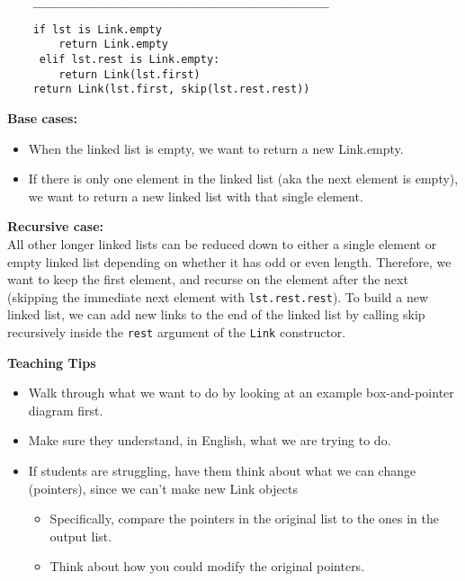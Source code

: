 \begin{parts}
\begin{blocksection}
\begin{lstlisting}
    ______________________________________________
\end{lstlisting}
\begin{solution}[0in]
\begin{lstlisting}
    if lst is Link.empty
    	return Link.empty
     elif lst.rest is Link.empty:
        return Link(lst.first)
    return Link(lst.first, skip(lst.rest.rest))
\end{lstlisting}
\textbf{Base cases:}
\begin{itemize}
\item When the linked list is empty, we want to return a new Link.empty.
\item If there is only one element in the linked list (aka the next element is empty), we want to return a new linked list with that single element.
\end{itemize}
\textbf{Recursive case:} \\
All other longer linked lists can be reduced down to either a single element or empty linked list depending on whether it has odd or even length. Therefore, we want to keep the first element, and recurse on the element after the next (skipping the immediate next element with \lstinline{lst.rest.rest}). To build a new linked list, we can add new links to the end of the linked list by calling skip recursively inside the \lstinline{rest} argument of the \lstinline{Link} constructor.
\end{solution}
\end{blocksection}
\begin{questionmeta}
\textbf{Teaching Tips}
\begin{itemize}
    \item Walk through what we want to do by looking at an example box-and-pointer diagram first.
    \item Make sure they understand, in English, what we are trying to do.
    \item If students are struggling, have them think about what we can change (pointers), since we can't make new Link objects
    \begin{itemize}
        \item Specifically, compare the pointers in the original list to the ones in the output list.
        \item Think about how you could modify the original pointers.
    \end{itemize}
\end{itemize}
\end{questionmeta}


\end{parts}

